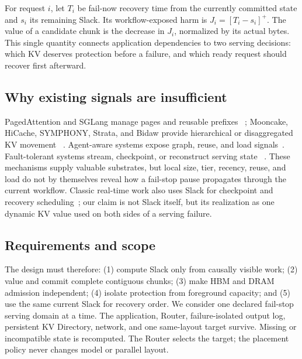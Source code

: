 For request $i$, let $T_i$ be fail-now recovery time from the currently
committed state and $s_i$ its remaining Slack.  Its workflow-exposed harm is
$J_i=[T_i-s_i]^+$.  The value of a candidate chunk is the decrease in $J_i$,
normalized by its actual bytes.  This single quantity connects application
dependencies to two serving decisions: which KV deserves protection before a
failure, and which ready request should recover first afterward.

\subsection{Why existing signals are insufficient}

PagedAttention and SGLang manage pages and reusable prefixes
~\cite{kwon2023vllm,zheng2024sglang}; Mooncake, HiCache, SYMPHONY, Strata, and
Bidaw provide hierarchical or disaggregated KV movement
~\cite{qin2025mooncake,xie2025hicache,agarwal2026symphony,
xie2026strata,hu2026bidaw}.  Agent-aware systems expose graph, reuse, and load
signals~\cite{lin2024parrot,pan2025kvflow,yu2026pythia,luo2026agentix,
bian2026tokencake,li2026continuum,zheng2026pbkv,bian2026tokendance}.
Fault-tolerant systems stream, checkpoint, or reconstruct serving state
~\cite{strati2024dejavu,jayakody2026ghostserve,xu2026raidserve,
qian2026kevlarflow,cao2026lumen,gan2026concordia}.  These mechanisms supply
valuable substrates, but local size, tier, recency, reuse, and load do not by
themselves reveal how a fail-stop pause propagates through the current
workflow.  Classic real-time work also uses Slack for checkpoint and recovery
scheduling~\cite{melhem2004interplay,acharya2008dynamic}; our claim is not
Slack itself, but its realization as one dynamic KV value used on both sides
of a serving failure.

\subsection{Requirements and scope}

The design must therefore: (1) compute Slack only from causally visible work;
(2) value and commit complete contiguous chunks; (3) make HBM and DRAM
admission independent; (4) isolate protection from foreground capacity; and
(5) use the same current Slack for recovery order.  We consider one declared
fail-stop serving domain at a time.  The application, Router, failure-isolated
output log, persistent KV Directory, network, and one same-layout target
survive.  Missing or incompatible state is recomputed.  The Router selects the
target; the placement policy never changes model or parallel layout.
